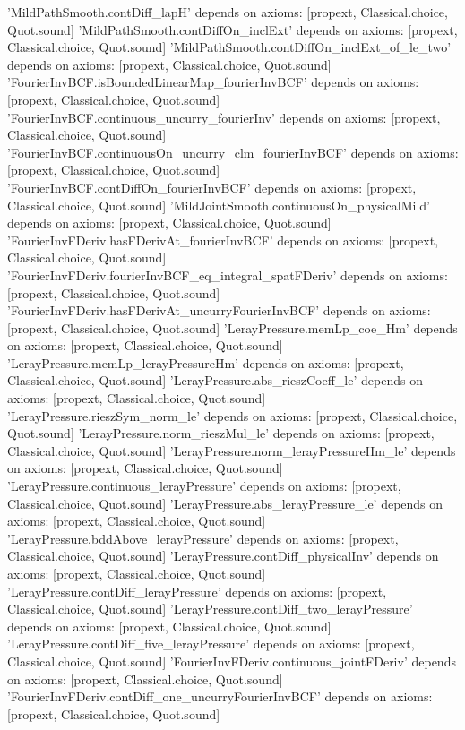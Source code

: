 \documentclass[11pt,a4paper]{article}
\theoremstyle{definition}
\theoremstyle{remark}
\begin{document}
\begin{leancode}
'MildPathSmooth.contDiff_lapH' depends on axioms: [propext, Classical.choice, Quot.sound]
'MildPathSmooth.contDiffOn_inclExt' depends on axioms: [propext, Classical.choice, Quot.sound]
'MildPathSmooth.contDiffOn_inclExt_of_le_two' depends on axioms: [propext, Classical.choice, Quot.sound]
'FourierInvBCF.isBoundedLinearMap_fourierInvBCF' depends on axioms: [propext, Classical.choice, Quot.sound]
'FourierInvBCF.continuous_uncurry_fourierInv' depends on axioms: [propext, Classical.choice, Quot.sound]
'FourierInvBCF.continuousOn_uncurry_clm_fourierInvBCF' depends on axioms: [propext, Classical.choice, Quot.sound]
'FourierInvBCF.contDiffOn_fourierInvBCF' depends on axioms: [propext, Classical.choice, Quot.sound]
'MildJointSmooth.continuousOn_physicalMild' depends on axioms: [propext, Classical.choice, Quot.sound]
'FourierInvFDeriv.hasFDerivAt_fourierInvBCF' depends on axioms: [propext, Classical.choice, Quot.sound]
'FourierInvFDeriv.fourierInvBCF_eq_integral_spatFDeriv' depends on axioms: [propext, Classical.choice, Quot.sound]
'FourierInvFDeriv.hasFDerivAt_uncurryFourierInvBCF' depends on axioms: [propext, Classical.choice, Quot.sound]
'LerayPressure.memLp_coe_Hm' depends on axioms: [propext, Classical.choice, Quot.sound]
'LerayPressure.memLp_lerayPressureHm' depends on axioms: [propext, Classical.choice, Quot.sound]
'LerayPressure.abs_rieszCoeff_le' depends on axioms: [propext, Classical.choice, Quot.sound]
'LerayPressure.rieszSym_norm_le' depends on axioms: [propext, Classical.choice, Quot.sound]
'LerayPressure.norm_rieszMul_le' depends on axioms: [propext, Classical.choice, Quot.sound]
'LerayPressure.norm_lerayPressureHm_le' depends on axioms: [propext, Classical.choice, Quot.sound]
'LerayPressure.continuous_lerayPressure' depends on axioms: [propext, Classical.choice, Quot.sound]
'LerayPressure.abs_lerayPressure_le' depends on axioms: [propext, Classical.choice, Quot.sound]
'LerayPressure.bddAbove_lerayPressure' depends on axioms: [propext, Classical.choice, Quot.sound]
'LerayPressure.contDiff_physicalInv' depends on axioms: [propext, Classical.choice, Quot.sound]
'LerayPressure.contDiff_lerayPressure' depends on axioms: [propext, Classical.choice, Quot.sound]
'LerayPressure.contDiff_two_lerayPressure' depends on axioms: [propext, Classical.choice, Quot.sound]
'LerayPressure.contDiff_five_lerayPressure' depends on axioms: [propext, Classical.choice, Quot.sound]
'FourierInvFDeriv.continuous_jointFDeriv' depends on axioms: [propext, Classical.choice, Quot.sound]
'FourierInvFDeriv.contDiff_one_uncurryFourierInvBCF' depends on axioms: [propext, Classical.choice, Quot.sound]

\end{leancode}
\end{document}
